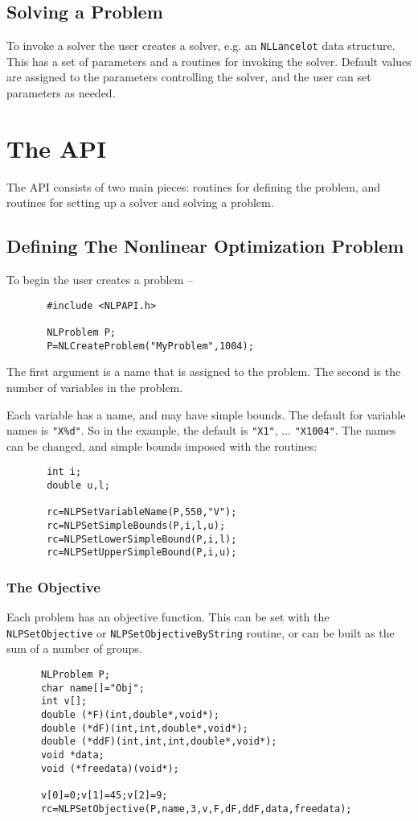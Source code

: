 \documentclass[12pt]{article}
\begin{document}
   \subsection{Solving a Problem}

     To invoke a solver the user creates a solver, e.g. an {\tt NLLancelot} data structure.
    This has a set of parameters and a routines for invoking the solver.
    Default values are assigned to the parameters controlling the solver, and the user 
    can set parameters as needed.

   \section{The API}

   The API consists of two main pieces: routines for defining the problem, and routines for setting up
   a solver and solving a problem.

   \subsection{Defining The Nonlinear Optimization Problem}

     To begin the user creates a problem --
     \begin{verbatim}
       #include <NLPAPI.h>

       NLProblem P;
       P=NLCreateProblem("MyProblem",1004);
     \end{verbatim}
     The first argument is a name that is assigned to the problem. The second is the number of variables in 
     the problem.

     Each variable has a name, and may have simple bounds. The default for variable names is {\tt "X\%d"}. So in the
     example, the default is {\tt "X1"}, ... {\tt "X1004"}. The names can be changed, and simple bounds imposed with
     the routines:
     \begin{verbatim}
       int i;
       double u,l;

       rc=NLPSetVariableName(P,550,"V");
       rc=NLPSetSimpleBounds(P,i,l,u);
       rc=NLPSetLowerSimpleBound(P,i,l);
       rc=NLPSetUpperSimpleBound(P,i,u);
     \end{verbatim}

   \subsubsection{The Objective}

     Each problem has an objective function. This can be set with the {\tt NLPSet\-Objective} or
     {\tt NLPSet\-Objective\-ByString} routine, or can be built as the sum of a number of groups.
     \begin{verbatim}
      NLProblem P;
      char name[]="Obj";
      int v[];
      double (*F)(int,double*,void*);
      double (*dF)(int,int,double*,void*);
      double (*ddF)(int,int,int,double*,void*);
      void *data;
      void (*freedata)(void*);

      v[0]=0;v[1]=45;v[2]=9;
      rc=NLPSetObjective(P,name,3,v,F,dF,ddF,data,freedata);
     \end{verbatim}
\end{document}
